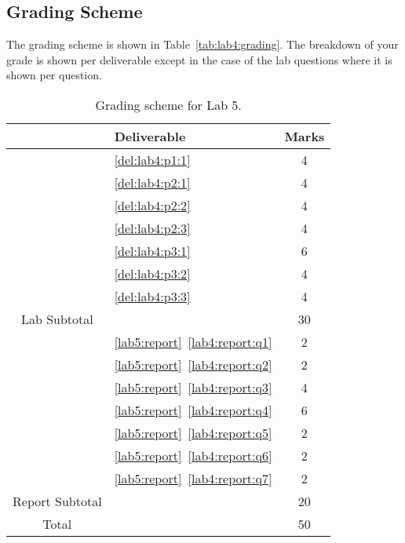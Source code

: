 \subsection{Grading Scheme}
The grading scheme is shown in Table~\ref{tab:lab4:grading}. The breakdown of
your grade is shown per deliverable except in the case of the lab
questions where it is shown per question.
%
\begin{table}
\centering
\begin{tabular}{c|l|c}
        & Deliverable           & Marks  \\ \hline
        & \ref{del:lab4:p1:1}         & 4       \\ \hline
        & \ref{del:lab4:p2:1}         & 4       \\ \hline
        & \ref{del:lab4:p2:2}         & 4      \\ \hline
        & \ref{del:lab4:p2:3}         & 4      \\ \hline
        & \ref{del:lab4:p3:1}         & 6       \\ \hline
        & \ref{del:lab4:p3:2}         & 4       \\ \hline
        & \ref{del:lab4:p3:3}         & 4       \\ \hhline{=|=|=}
Lab Subtotal&                       & 30      \\ \hhline{=|=|=}
        & \ref{lab5:report}~\ref{lab4:report:q1}  & 2       \\ \hline
        & \ref{lab5:report}~\ref{lab4:report:q2}  & 2       \\ \hline
        & \ref{lab5:report}~\ref{lab4:report:q3}  & 4       \\ \hline
        & \ref{lab5:report}~\ref{lab4:report:q4}  & 6       \\ \hline
        & \ref{lab5:report}~\ref{lab4:report:q5}  & 2      \\ \hline
        & \ref{lab5:report}~\ref{lab4:report:q6}  & 2      \\ \hline
        & \ref{lab5:report}~\ref{lab4:report:q7}  & 2      \\ \hhline{=|=|=}
Report Subtotal&  & 20 \\ \hhline{=|=|=}
  Total &                       & 50
\end{tabular}
\caption[Grading Scheme for Lab 5]{Grading scheme for Lab 5.}
\label{tab:lab5:grading}
\end{table}
%
